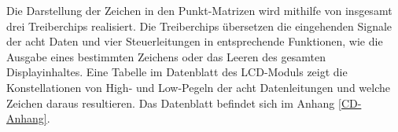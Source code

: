 Die Darstellung der Zeichen in den Punkt-Matrizen wird mithilfe von insgesamt drei Treiberchips realisiert. Die Treiberchips übersetzen die eingehenden Signale der acht Daten und  vier Steuerleitungen in entsprechende Funktionen, wie die Ausgabe eines bestimmten Zeichens oder das Leeren des gesamten Displayinhaltes. Eine Tabelle im Datenblatt des LCD-Moduls zeigt die Konstellationen von High- und Low-Pegeln der acht Datenleitungen und welche Zeichen daraus resultieren. Das Datenblatt befindet sich im Anhang \ref{CD-Anhang}.
